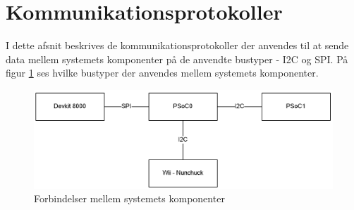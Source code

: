 \section{Kommunikationsprotokoller}
\label{afsnit:kommunikationsprotokoller}
I dette afsnit beskrives de kommunikationsprotokoller der anvendes til at sende data mellem systemets komponenter på de anvendte bustyper - I2C og SPI. På figur \ref{fig:kommunikationsOverblik} ses hvilke bustyper der anvendes mellem systemets komponenter. 

\begin{figure}[H]
	\centering
	\includegraphics[width=\textwidth] {Systemarkitektur/images/anvendtebustyper}
	\caption{Forbindelser mellem systemets komponenter}
	\label{fig:kommunikationsOverblik}
\end{figure}

